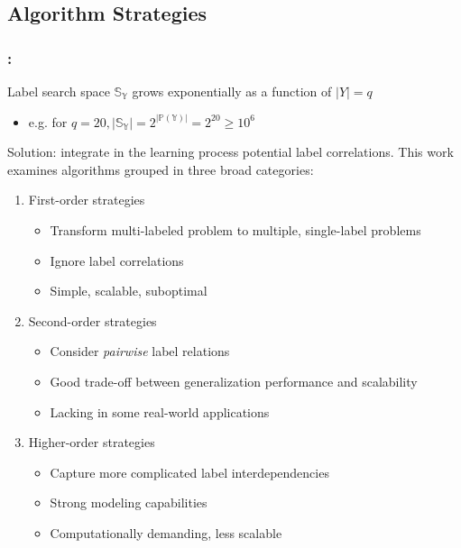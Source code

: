\documentclass{beamer}
\begin{document}
\subsection{Algorithm Strategies}
\begin{frame}
\frametitle{\insertsection : \insertsubsection}
Label search space $\mathbb{S_Y}$ grows exponentially as a function of $|Y|=q$
\begin{itemize}
	\item e.g. for $q=20, |\mathbb{S_Y}| = 2 ^ {|\mathbb{P(Y)}|} = 2^{20} \ge 10^6$
\end{itemize}
Solution: integrate in the learning process potential label correlations.
This work examines algorithms grouped in three broad categories:

\begin{enumerate}
	\item First-order strategies
		\begin{itemize}
			\item Transform multi-labeled problem to multiple, single-label problems 
			\item Ignore label correlations 
			\item Simple, scalable, suboptimal
		\end{itemize}
	\item Second-order strategies
		\begin{itemize}
			\item Consider \emph{pairwise} label relations
			\item Good trade-off between generalization performance and scalability
			\item Lacking in some real-world applications
		\end{itemize} 
	\item Higher-order strategies
		\begin{itemize}
			\item Capture more complicated label interdependencies
			\item Strong modeling capabilities
			\item Computationally demanding, less scalable
		\end{itemize}

\end{enumerate}
\end{frame}

\end{document}
